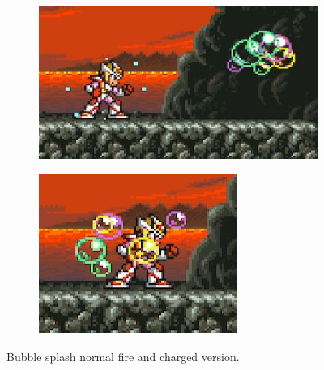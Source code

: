 \begin{figure}[htp]
	\centering
	\begin{subfigure}{0.4\linewidth}
		\includegraphics[width=\linewidth]{figures/X2/weapons/B_splash_1.jpg}	
	\end{subfigure}
	\begin{subfigure}{0.275\linewidth}
		\includegraphics[width=\linewidth]{figures/X2/weapons/B_splash_2.jpg}	
	\end{subfigure}
	\caption{Bubble splash normal fire and charged version.}
\end{figure}

